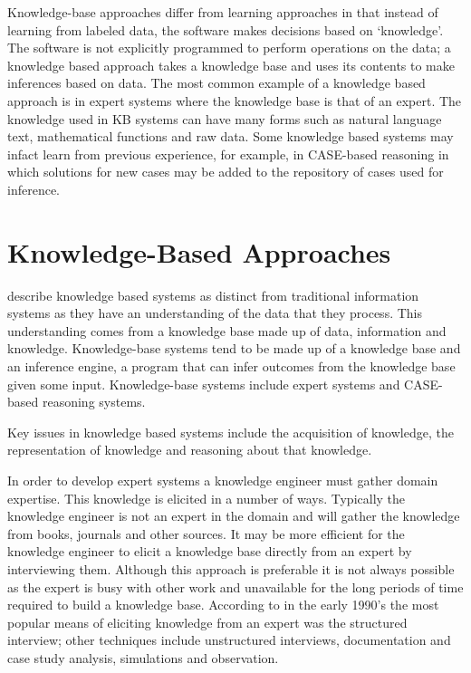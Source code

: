 Knowledge-base approaches differ from learning approaches in that instead of learning from labeled data, the software makes decisions based on `knowledge'. The software is not explicitly programmed to perform operations on the data; a knowledge based approach takes a knowledge base and uses its contents to make inferences based on data. The most common example of a knowledge based approach is in expert systems where the knowledge base is that of an expert. The knowledge used in KB systems can have many forms such as natural language text, mathematical functions and raw data. Some knowledge based systems may infact learn from previous experience, for example, in CASE-based reasoning in which solutions for new cases may be added to the repository of cases used for inference.

\section{Knowledge-Based Approaches}

\cite{akerkar2010knowledge} describe knowledge based systems as distinct from traditional information systems as they have an understanding of the data that they process. This understanding comes from a knowledge base made up of data, information and knowledge. Knowledge-base systems tend to be made up of a knowledge base and an inference engine, a program that can infer outcomes from the knowledge base given some input. Knowledge-base systems include expert systems and CASE-based reasoning systems. 

Key issues in knowledge based systems include the acquisition of knowledge, the representation of knowledge and reasoning about that knowledge.

In order to develop expert systems a knowledge engineer must gather domain expertise. This knowledge is elicited in a number of ways. Typically the knowledge engineer is not an expert in the domain and will gather the knowledge from books, journals and other sources. It may be more efficient for the knowledge engineer to elicit a knowledge base directly from an expert by interviewing them. Although this approach is preferable it is not always possible as the expert is busy with other work and unavailable for the long periods of time required to build a knowledge base. According to \cite{sagheb2009conceptual} in the early 1990's the most popular means of eliciting knowledge from an expert was the structured interview; other techniques include unstructured interviews, documentation and case study analysis, simulations and observation. 

